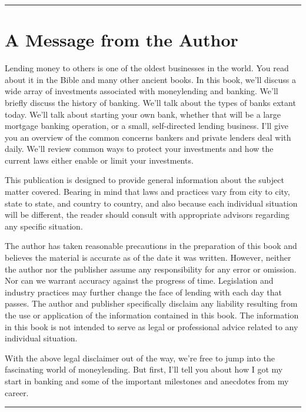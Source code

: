 \documentclass[
]{book}
\begin{document}
\begin{center}\rule{0.5\linewidth}{0.5pt}\end{center}

\hypertarget{authormessage}{%
\chapter*{A Message from the Author}\label{authormessage}}


Lending money to others is one of the oldest businesses in the world. You read about it in the Bible and many other ancient books. In this book, we'll discuss a wide array of investments associated with moneylending and banking. We'll briefly discuss the history of banking. We'll talk about the types of banks extant today. We'll talk about starting your own bank, whether that will be a large mortgage banking operation, or a small, self-directed lending business. I'll give you an overview of the common concerns bankers and private lenders deal with daily. We'll review common ways to protect your investments and how the current laws either enable or limit your investments.

This publication is designed to provide general information about the subject matter covered. Bearing in mind that laws and practices vary from city to city, state to state, and country to country, and also because each individual situation will be different, the reader should consult with appropriate advisors regarding any specific situation.

The author has taken reasonable precautions in the preparation of this book and believes the material is accurate as of the date it was written. However, neither the author nor the publisher assume any responsibility for any error or omission. Nor can we warrant accuracy against the progress of time. Legislation and industry practices may further change the face of lending with each day that passes. The author and publisher specifically disclaim any liability resulting from the use or application of the information contained in this book. The information in this book is not intended to serve as legal or professional advice related to any individual situation.

With the above legal disclaimer out of the way, we're free to jump into the fascinating world of moneylending. But first, I'll tell you about how I got my start in banking and some of the important milestones and anecdotes from my career.

\begin{center}\rule{0.5\linewidth}{0.5pt}\end{center}
\end{document}
